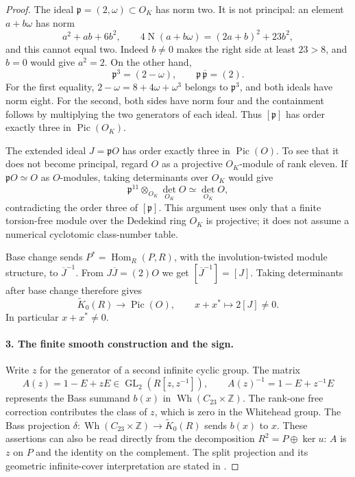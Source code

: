 \begin{proof}
The ideal $\mathfrak p=(2,\omega)\subset O_K$ has norm two.
It is not principal: an element $a+b\omega$ has norm
\[
 a^2+ab+6b^2,\qquad
 4\operatorname N(a+b\omega)=(2a+b)^2+23b^2,
\]
and this cannot equal two.  Indeed $b\ne0$ makes the right side
at least $23>8$, and $b=0$ would give $a^2=2$.
On the other hand,
\[
 \mathfrak p^3=(2-\omega),\qquad
 \mathfrak p\,\overline{\mathfrak p}=(2).                 \tag{A5.11.4}
\]
For the first equality, $2-\omega=8+4\omega+\omega^3$
belongs to $\mathfrak p^3$, and both ideals have norm eight.
For the second, both sides have norm four and the containment
follows by multiplying the two generators of each ideal.
Thus $[\mathfrak p]$ has order exactly three in
$\operatorname{Pic}(O_K)$.

The extended ideal $J=\mathfrak p O$ has order exactly three in
$\operatorname{Pic}(O)$.  To see that it does not become principal,
regard $O$ as a projective $O_K$-module of rank eleven.  If
$\mathfrak p O\simeq O$ as $O$-modules, taking determinants over
$O_K$ would give
\[
 \mathfrak p^{11}\otimes_{O_K}\det_{O_K}O
       \simeq\det_{O_K}O,
\]
contradicting the order three of $[\mathfrak p]$.  This argument
uses only that a finite torsion-free module over the Dedekind ring
$O_K$ is projective; it does not assume a numerical cyclotomic
class-number table.

Base change sends $P^*=\operatorname{Hom}_R(P,R)$, with the
involution-twisted module structure, to
$\overline J^{-1}$.  From $J\overline J=(2)O$ we get
$[\overline J^{-1}]=[J]$.  Taking determinants after base change
therefore gives
\[
 \widetilde K_0(R)\longrightarrow\operatorname{Pic}(O),
 \qquad x+x^*\longmapsto2[J]\ne0.                        \tag{A5.11.5}
\]
In particular $x+x^*\ne0$.

\paragraph{3. The finite smooth construction and the sign.}
Write $z$ for the generator of a second infinite cyclic group.
The matrix
\[
 A(z)=1-E+zE\in\operatorname{GL}_2(R[z,z^{-1}]),\qquad
 A(z)^{-1}=1-E+z^{-1}E                                  \tag{A5.11.6}
\]
represents the Bass summand $b(x)$ in
$\operatorname{Wh}(C_{23}\times\mathbb Z)$.
The rank-one free correction contributes the class of $z$, which
is zero in the Whitehead group.  The Bass projection
$\delta:\operatorname{Wh}(C_{23}\times\mathbb Z)
\to\widetilde K_0(R)$ sends $b(x)$ to $x$.
These assertions can also be read directly from the decomposition
$R^2=P\oplus\ker u$: $A$ is $z$ on $P$ and the identity on the
complement.  The split projection and its geometric infinite-cover
interpretation are stated in \cite[printed pp.124--125,
Example 11.5(ii)]{A5-HughesRanicki1996}.


\end{proof}
